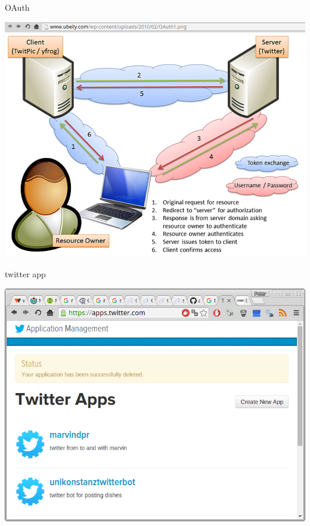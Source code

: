 \documentclass[ignorenonframetext,]{beamer}
\begin{document}
\begin{frame}{OAuth}

\includegraphics{fig/oauth.png}

\end{frame}

\begin{frame}{twitter app}

\includegraphics{fig/twitterapp1.png}

\end{frame}
\end{document}
